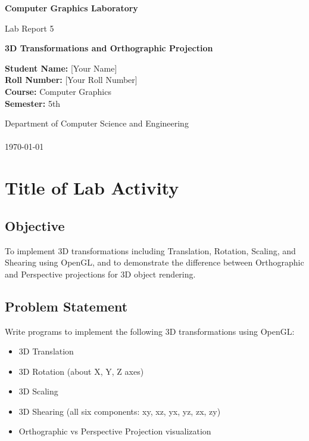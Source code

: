\documentclass[12pt,a4paper]{article}
\begin{document}
\begin{titlepage}
    \centering
    \vspace*{0.5cm}
    
    \Huge
    \textbf{Computer Graphics Laboratory}
    
    \vspace{0.5cm}
    \LARGE
    Lab Report 5
    
    \vspace{1.5cm}
    
    \textbf{\huge 3D Transformations and Orthographic Projection}
    
    \vspace{4cm}
    
    \vspace{2cm}
    
    \Large
    \textbf{Student Name:} [Your Name]\\
    \textbf{Roll Number:} [Your Roll Number]\\
    \textbf{Course:} Computer Graphics\\
    \textbf{Semester:} 5th\\
    
    \vfill
    
    \large
    Department of Computer Science and Engineering\\
    [Your University Name]\\
    \today
    
\end{titlepage}

\tableofcontents
\newpage

\section{Title of Lab Activity}

\subsection{Objective}
To implement 3D transformations including Translation, Rotation, Scaling, and Shearing using OpenGL, and to demonstrate the difference between Orthographic and Perspective projections for 3D object rendering.

\subsection{Problem Statement}
Write programs to implement the following 3D transformations using OpenGL:
\begin{itemize}
    \item 3D Translation
    \item 3D Rotation (about X, Y, Z axes)
    \item 3D Scaling
    \item 3D Shearing (all six components: xy, xz, yx, yz, zx, zy)
    \item Orthographic vs Perspective Projection visualization
\end{itemize}
\end{document}
